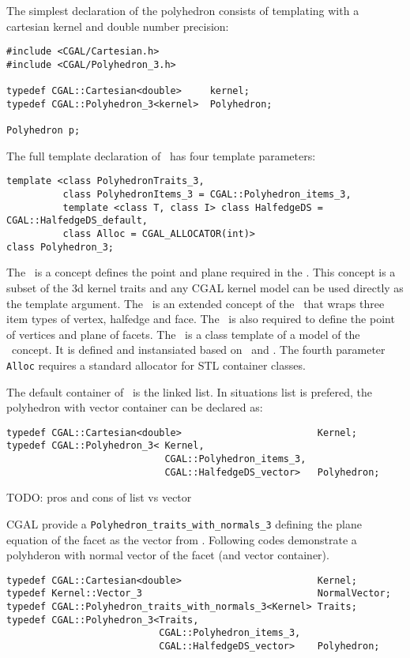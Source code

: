 The simplest declaration of the polyhedron consists 
of templating with a cartesian kernel and double
number precision:
\begin{lstlisting}
#include <CGAL/Cartesian.h>
#include <CGAL/Polyhedron_3.h>

typedef CGAL::Cartesian<double>     kernel;
typedef CGAL::Polyhedron_3<kernel>  Polyhedron;

Polyhedron p;
\end{lstlisting}

The full template declaration of \poly\ has four template parameters: 
\begin{lstlisting}
template <class PolyhedronTraits_3,
          class PolyhedronItems_3 = CGAL::Polyhedron_items_3,
          template <class T, class I> class HalfedgeDS = CGAL::HalfedgeDS_default,
          class Alloc = CGAL_ALLOCATOR(int)>
class Polyhedron_3;
\end{lstlisting}

The \polytrait\ is a concept defines the point and plane required in
the \poly . This concept is a subset of the 3d kernel traits and any 
CGAL kernel model can be used directly as the template argument.
The \polyitem\ is an extended concept of the \hdsitem\ that wraps three 
item types of vertex, halfedge and face. The \polyitem\ is also required
to define the point of vertices and plane of facets.
The \hds\ is a class template of a model of the \hds\ concept. It is
defined and instansiated based on \polytrait\ and \polyitem .
The fourth parameter \lstinline!Alloc! requires a standard allocator 
for STL container classes.

The default container of \poly\ is the linked list. In situations
list is prefered, the polyhedron with vector container can be declared 
as:
\begin{lstlisting}
typedef CGAL::Cartesian<double>                        Kernel;
typedef CGAL::Polyhedron_3< Kernel,
                            CGAL::Polyhedron_items_3, 
                            CGAL::HalfedgeDS_vector>   Polyhedron;
\end{lstlisting}

TODO: pros and cons of list vs vector

CGAL provide a \lstinline!Polyhedron_traits_with_normals_3! 
defining the plane equation of the facet as the vector from  . 
Following codes demonstrate a polyhderon with normal vector of 
the facet (and vector container).
\begin{lstlisting}
typedef CGAL::Cartesian<double>                        Kernel;
typedef Kernel::Vector_3                               NormalVector;
typedef CGAL::Polyhedron_traits_with_normals_3<Kernel> Traits;
typedef CGAL::Polyhedron_3<Traits,
                           CGAL::Polyhedron_items_3, 
                           CGAL::HalfedgeDS_vector>    Polyhedron;
\end{lstlisting}

